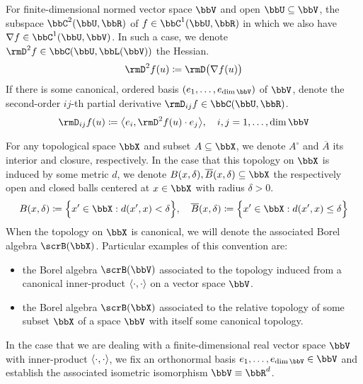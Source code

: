 \begin{itemize}
    For finite-dimensional normed vector space $\vecSpace$ and open $\bbU \subseteq \vecSpace$, the subspace $\ccpathSpace{2}{\bbU}{\bbR}$ of $f \in \ccpathSpace{1}{\bbU}{\bbR}$ in which we also have $\nabla f \in \ccpathSpace{1}{\bbU}{\vecSpace}$.
    In such a case, we denote $\Hess f \in \cpathSpace{\bbU}{\bbL(\vecSpace)}$ the Hessian.
    \[
      \Hess f(\momentVar) \defeq \Der\big( \nabla f(u) \big)
    \]
    If there is some canonical, ordered basis $(\basisVec_1, \ldots, \basisVec_{\operatorname{dim}\vecSpace})$ of $\vecSpace$, denote the second-order $ij$-th partial derivative $\Der_{ij} f \in \cpathSpace{\bbU}{\bbR}$.
    \[
      \Der_{ij} f(\momentVar) \defeq \bprj{\basisVec_i}{\Hess f(\momentVar) \cdot \basisVec_j}, \quad i,j = 1, \ldots, \operatorname{dim}\vecSpace
    \]
\end{itemize}
For any topological space $\stateSpace$ and subset $A \subseteq \stateSpace$, we denote $A^\circ$ and $\overline A$ its interior and closure, respectively.
In the case that this topology on $\stateSpace$ is induced by some metric $d$, we denote $\ball{\stateVar}{\delta}, \closedBall{\stateVar}{\delta} \subseteq \stateSpace$ the respectively open and closed balls centered at $\stateVar \in \stateSpace$ with radius $\delta > 0$.
\begin{equation*}
  \ball{\stateVar}{\delta} \defeq \Big\{ \stateVar' \in \stateSpace : d(\stateVar', \stateVar) < \delta \Big\}, \quad
  \closedBall{\stateVar}{\delta} \defeq \Big\{ \stateVar' \in \stateSpace : d(\stateVar', \stateVar) \leq \delta \Big\}
\end{equation*}
When the topology on $\stateSpace$ is canonical, we will denote the associated Borel algebra $\scrB(\stateSpace)$.
Particular examples of this convention are:
\begin{itemize}
  \item
    the Borel algebra $\scrB(\vecSpace)$ associated to the topology induced from a canonical inner-product ${\langle \cdot , \cdot \rangle}$ on a vector space $\vecSpace$.
  \item
    the Borel algebra $\scrB(\stateSpace)$ associated to the relative topology of some subset $\stateSpace$ of a space $\vecSpace$ with itself some canonical topology.
\end{itemize}
In the case that we are dealing with a finite-dimensional real vector space $\vecSpace$ with inner-product ${\langle \cdot , \cdot \rangle}$, we fix an orthonormal basis $\basisVec_1, \ldots, \basisVec_{\operatorname{dim}\vecSpace} \in \vecSpace$ and establish the associated isometric isomorphism $\vecSpace \equiv \bbR^d$.
